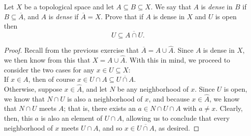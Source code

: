 \documentclass[12pt]{article}
\newenvironment{problem}[2][Problem]{\begin{trivlist}
\item[\hskip \labelsep {\bfseries #1}\hskip \labelsep {\bfseries #2.}]}{\end{trivlist}}
\begin{document}
\begin{problem}{4}
  Let $X$ be a topological space and let $A\subseteq B\subseteq X$.
  We say that $A$ is \textit{dense} in $B$ if $B\subseteq\overline{A}$, 
  and $A$ is \textit{dense} if $\overline{A}=X$.
  Prove that if $A$ is dense in $X$ and $U$ is open then 
  $$U\subseteq \overline{A\cap U}.$$
\end{problem}
\begin{proof}
  Recall from the previous exercise that $\overline{A}=A\cup\widehat{A}$.
  Since $A$ is dense in $X$, we then know from this that $X=A\cup\widehat{A}$.
  With this in mind, we proceed to consider the two cases for any $x\in U\subseteq X$:\\
  \indent If $x\in A$, then of course $x\in U\cap A\subseteq\overline{U\cap A}$.\\
  \indent Otherwise, suppose $x\in \widehat{A}$, and let $N$ be any neighborhood of $x$.
  Since $U$ is open, we know that $N\cap U$ is also a neighborhood of $x$, 
  and because $x\in\widehat{A}$, we know that $N\cap U$ meets $A$; 
  that is, there exists an $a\in N\cap U\cap A$ with $a\neq x$.
  Clearly, then, this $a$ is also an element of $U\cap A$, allowing us to conclude that
  every neighborhood of $x$ meets $U\cap A$, and so $x\in \overline{U\cap A}$, as desired.
\end{proof}
\end{document}
